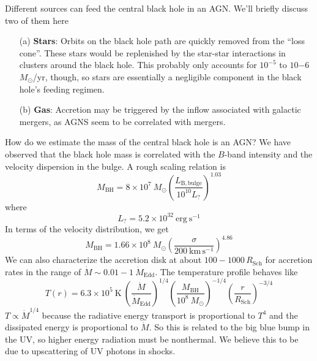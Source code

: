 \documentclass[10pt]{article}
\numberwithin{equation}{section}
\newcommand{\n}{\noindent}
\begin{document}
	\n Different sources can feed the central black hole in an AGN. We'll briefly discuss two of them here
	\begin{enumerate}
		\item[(a)] \textbf{Stars}: Orbits on  the black hole path are quickly removed from the ``loss cone''. These stars would be replenished by the star-star interactions in clusters around the black hole. This probably only accounts for $10^{-5}$ to $10{-6}$ $M_\odot$/yr, though, so stars are essentially a negligible component in the black hole's feeding regimen.
		\item[(b)] \textbf{Gas}: Accretion may be triggered by the inflow associated with galactic mergers, as AGNS seem to be correlated with mergers.
	\end{enumerate}
	How do we estimate the mass of the central black hole is an AGN? We have observed that the black hole mass is correlated with the $B$-band intensity and the velocity dispersion in the bulge. A rough scaling relation is
	\begin{equation}
		\label{eq:feed:1} M_{\mathrm{BH}} = 8\times 10^7\ M_\odot\left(\frac{L_{\mathrm{B,bulge}}}{10^{10}L_?}\right)^{1.03}
	\end{equation}
	where
	\begin{equation}
		\label{eq:feed:2} L_? = 5.2\times 10^{32}\ \mathrm{erg\ s^{-1}}
	\end{equation}
	In terms of the velocity distribution, we get
	\begin{equation}
		\label{eq:feed:3} M_{\mathrm{BH}} = 1.66\times 10^8\ M_\odot\left(\frac{\sigma}{200\ \mathrm{km\,s^{-1}}}\right)^{4.86}
	\end{equation}
	We can also characterize the accretion disk at about $100-1000\,R_{\mathrm{Sch}}$ for accretion rates in the range of $\dot{M}\sim 0.01-1\ \dot{M}_{\mathrm{Edd}}$. The temperature profile behaves like
	\begin{equation}
		\label{feed:4} T(r) = 6.3\times 10^5\ \mathrm{K}\ \left(\frac{\dot{M}}{\dot{M}_{\mathrm{Edd}}}\right)^{1/4} \left(\frac{M_{\mathrm{BH}}}{10^8\ M_\odot}\right)^{-1/4}\left(\frac{r}{R_{\mathrm{Sch}}}\right)^{-3/4}
	\end{equation}
	$T\propto \dot{M}^{1/4}$ because the radiative energy transport is proportional to $T^4$ and the dissipated energy is proportional to $\dot{M}$. So this is related to the big blue bump in the UV, so higher energy radiation must be nonthermal. We believe this to be due to upscattering of UV photons in shocks.\\
\end{document}
